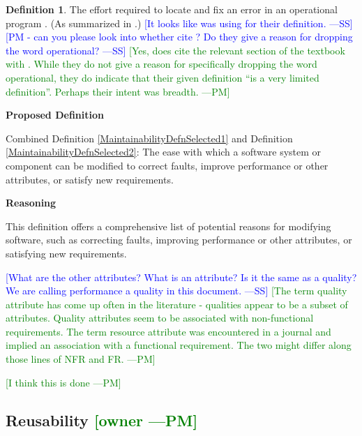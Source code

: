 \documentclass[letterpaper,cleveref]{lipics-v2019}
\newcommand{\authornote}[3]{\textcolor{#1}{[#3 ---#2]}}
\newcommand{\authornote}[3]{}
\newcommand{\wss}[1]{\authornote{blue}{SS}{#1}} %
\newcommand{\pmi}[1]{\authornote{green}{PM}{#1}} %
\theoremstyle{definition}
\newtheorem{defn}{Definition}
\begin{document}
\begin{defn}
	The effort required to locate and fix an error in an operational program
	\citep{McCallEtAl1977}. (As summarized in \citet{VanVliet2000}.) \wss{It looks
		like \citet{pressman2005software} was using \citet{McCallEtAl1977} for their
		definition.} \wss{PM - can you please look into whether
		\citet{pressman2005software} cite \citet{McCallEtAl1977}?  Do they give a
		reason for dropping the word operational?}
	\pmi{Yes, \citet{pressman2005software} does cite the relevant section of the
		textbook with \citet{McCallEtAl1977}. While they do not give a reason for
		specifically dropping the word operational, they do indicate that their given
		definition ``is a very limited definition''. Perhaps their intent was breadth.}
\end{defn}

\noindent \textbf{Proposed Definition}

Combined Definition \ref{MaintainabilityDefnSelected1} and Definition
\ref{MaintainabilityDefnSelected2}: The ease with which a software system or
component can be modified to correct faults, improve performance or other
attributes, or satisfy new requirements.

\noindent \textbf{Reasoning}

This definition offers a comprehensive list of potential reasons for modifying
software, such as correcting faults, improving performance or other attributes,
or satisfying new requirements.

\wss{What are the other attributes?  What is an attribute?  Is it the
	same as a quality?  We are calling performance a quality in this document.}
\pmi{The term quality attribute has come up often in the literature - qualities
	appear to be a subset of attributes. Quality attributes seem to be associated
	with non-functional requirements. The term resource attribute was encountered in
	a journal and implied an association with a functional requirement. The two
	might differ along those lines of NFR and FR.}

\pmi{I think this is done}

\subsection{{Reusability} \pmi{owner}}
\end{document}
